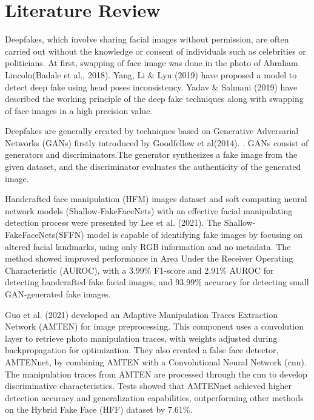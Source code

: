 \chapter{Literature Review}
Deepfakes, which involve sharing facial images without permission, are often carried out without the knowledge or consent of individuals such as celebrities or politicians. At first, swapping of face image was done in the photo of Abraham Lincoln(Badale et al., 2018)\cite{badale2018deep}. Yang, Li \& Lyu (2019)\cite{yang2019exposing} have proposed a model to detect deep fake using head poses inconsistency. Yadav \& Salmani (2019)\cite{yadav2019deepfake} have described the working principle of the deep fake techniques along with swapping of face images in a high precision value.

Deepfakes are generally created by techniques based on
Generative Adversarial Networks (GANs) firstly introduced
by Goodfellow et al(2014). \cite{goodfellow2014generative}. GANs consist of generators and discriminators.The generator synthesizes a fake image from the given dataset, and the discriminator evaluates the authenticity of the generated image.

Handcrafted face manipulation (HFM) images dataset and soft computing neural network models (Shallow-FakeFaceNets) with an effective facial manipulating detection process were presented by Lee et al. (2021)\cite{lee2021detecting}. The Shallow-FakeFaceNets(SFFN) model is capable of identifying fake images by focusing on altered facial landmarks, using only RGB information and no metadata. The method showed improved performance in Area Under the Receiver Operating Characteristic (AUROC), with a 3.99\% F1-score and 2.91\% AUROC for detecting handcrafted fake facial images, and 93.99\% accuracy for detecting small GAN-generated fake images.

Guo et al. (2021) \cite{guo2021fake} developed an Adaptive Manipulation Traces Extraction Network (AMTEN) for image preprocessing. This component uses a convolution layer to retrieve photo manipulation traces, with weights adjusted during backpropagation for optimization. They also created a false face detector, AMTENnet, by combining AMTEN with a Convolutional Neural Network (\acrshort{cnn}). The manipulation traces from AMTEN are processed through the \acrshort{cnn} to develop discriminative characteristics. Tests showed that AMTENnet achieved higher detection accuracy and generalization capabilities, outperforming other methods on the Hybrid Fake Face (HFF) dataset by 7.61\%.

